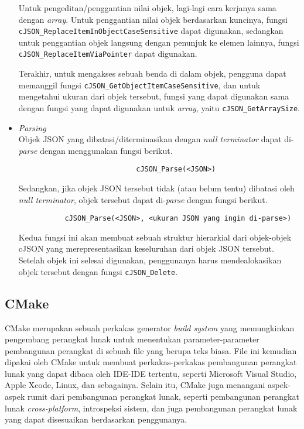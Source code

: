 \begin{itemize}[listparindent=\parindent]
	Untuk pengeditan/penggantian nilai objek, lagi-lagi cara kerjanya sama dengan \textit{array}. \mbox{Untuk} penggantian nilai objek berdasarkan kuncinya, fungsi \verb|cJSON_ReplaceItemInObject|\linebreak \verb|CaseSensitive| dapat digunakan, sedangkan untuk penggantian objek langsung dengan penunjuk ke elemen lainnya, fungsi \verb|cJSON_ReplaceItemViaPointer| dapat digunakan.

	Terakhir, untuk mengakses sebuah benda di dalam objek, pengguna dapat memanggil fungsi \verb|cJSON_GetObjectItemCaseSensitive|, dan untuk mengetahui ukuran dari objek tersebut, fungsi yang dapat digunakan sama dengan fungsi yang dapat digunakan untuk \textit{array}, yaitu \verb|cJSON_GetArraySize|.

	\item \textit{Parsing}\\
	Objek JSON yang dibatasi/diterminasikan dengan \textit{null terminator} dapat di-\textit{parse} dengan \mbox{menggunakan} fungsi berikut.
	\vspace{-0.1em} %
	\begin{verbatim}
                            cJSON_Parse(<JSON>)
	\end{verbatim}
	\vspace{-0.1em} %
	\noindent
	Sedangkan, jika objek JSON tersebut tidak (atau belum tentu) dibatasi oleh \textit{null terminator}, objek tersebut dapat di-\textit{parse} dengan fungsi berikut.
	\vspace{-0.1em} %
	\begin{verbatim}
           cJSON_Parse(<JSON>, <ukuran JSON yang ingin di-parse>)
	\end{verbatim}
	\vspace{-0.1em} %
	\noindent
	Kedua fungsi ini akan membuat sebuah struktur hierarkial dari objek-objek cJSON yang merepresentasikan keseluruhan dari objek JSON tersebut. Setelah objek ini selesai digunakan, penggunanya harus mendealokasikan objek tersebut dengan fungsi \verb|cJSON_Delete|.
\end{itemize}

\subsection[CMake]{CMake \cite{kitware:2022:masteringcmake}}
\label{sec:cmodules-CMake}

CMake merupakan sebuah perkakas generator \textit{build system} yang memungkinkan pengembang perangkat lunak untuk menentukan parameter-parameter pembangunan perangkat di sebuah file yang berupa teks biasa. File ini kemudian dipakai oleh CMake untuk membuat perkakas-perkakas pembangunan perangkat lunak yang dapat dibaca oleh IDE-IDE tertentu, seperti Microsoft Visual Studio, Apple Xcode, Linux, dan sebagainya. Selain itu, CMake juga menangani aspek-aspek rumit dari pembangunan perangkat lunak, seperti pembangunan perangkat lunak \textit{cross-platform}, introspeksi sistem, dan juga pembangunan perangkat lunak yang dapat disesuaikan berdasarkan penggunanya.

